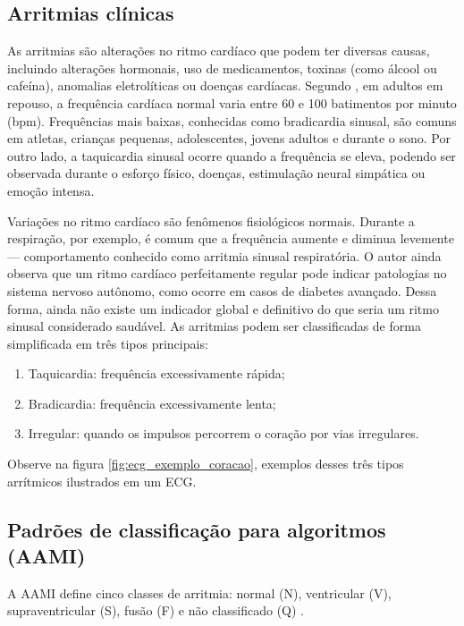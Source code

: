 \subsection{Arritmias clínicas}

As arritmias são alterações no ritmo cardíaco que podem ter diversas causas, incluindo alterações hormonais, uso de medicamentos, toxinas (como álcool ou cafeína), anomalias eletrolíticas ou doenças cardíacas.
Segundo , em adultos em repouso, a frequência cardíaca normal varia entre 60 e 100 batimentos por minuto (bpm). Frequências mais baixas, conhecidas como bradicardia sinusal, são comuns em atletas, crianças pequenas, adolescentes, jovens adultos e durante o sono. Por outro lado, a taquicardia sinusal ocorre quando a frequência se eleva, podendo ser observada durante o esforço físico, doenças, estimulação neural simpática ou emoção intensa.

Variações no ritmo cardíaco são fenômenos fisiológicos normais. Durante a respiração, por exemplo, é comum que a frequência aumente e diminua levemente — comportamento conhecido como arritmia sinusal respiratória. O autor ainda observa que um ritmo cardíaco perfeitamente regular pode indicar patologias no sistema nervoso autônomo, como ocorre em casos de diabetes avançado. Dessa forma, ainda não existe um indicador global e definitivo do que seria um ritmo sinusal considerado saudável.
As arritmias podem ser classificadas de forma simplificada em três tipos principais:

\begin{enumerate}
    \item Taquicardia: frequência excessivamente rápida;
    \item Bradicardia: frequência excessivamente lenta;
    \item Irregular: quando os impulsos percorrem o coração por vias irregulares.
\end{enumerate}

Observe na figura \ref{fig:ecg_exemplo_coracao}, exemplos desses três tipos arrítmicos ilustrados em um ECG.

\subsection{Padrões de classificação para algoritmos (AAMI)}
\label{sub_sec:padroes_arritmias_aami}

A AAMI define cinco classes de arritmia: normal (N), ventricular (V), supraventricular (S), fusão (F) e não classificado (Q) \cite{silva2025,saadatnejad2020}.

